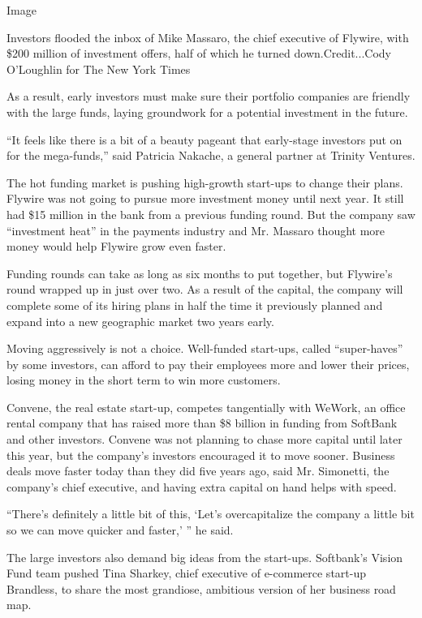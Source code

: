 Image

Investors flooded the inbox of Mike Massaro, the chief executive of
Flywire, with \$200 million of investment offers, half of which he
turned down.Credit...Cody O'Loughlin for The New York Times

As a result, early investors must make sure their portfolio companies
are friendly with the large funds, laying groundwork for a potential
investment in the future.

``It feels like there is a bit of a beauty pageant that early-stage
investors put on for the mega-funds,'' said Patricia Nakache, a general
partner at Trinity Ventures.

The hot funding market is pushing high-growth start-ups to change their
plans. Flywire was not going to pursue more investment money until next
year. It still had \$15 million in the bank from a previous funding
round. But the company saw ``investment heat'' in the payments industry
and Mr. Massaro thought more money would help Flywire grow even faster.

Funding rounds can take as long as six months to put together, but
Flywire's round wrapped up in just over two. As a result of the capital,
the company will complete some of its hiring plans in half the time it
previously planned and expand into a new geographic market two years
early.

Moving aggressively is not a choice. Well-funded start-ups, called
``super-haves'' by some investors, can afford to pay their employees
more and lower their prices, losing money in the short term to win more
customers.

Convene, the real estate start-up, competes tangentially with WeWork, an
office rental company that has raised more than \$8 billion in funding
from SoftBank and other investors. Convene was not planning to chase
more capital until later this year, but the company's investors
encouraged it to move sooner. Business deals move faster today than they
did five years ago, said Mr. Simonetti, the company's chief executive,
and having extra capital on hand helps with speed.

``There's definitely a little bit of this, `Let's overcapitalize the
company a little bit so we can move quicker and faster,' '' he said.

The large investors also demand big ideas from the start-ups. Softbank's
Vision Fund team pushed Tina Sharkey, chief executive of e-commerce
start-up Brandless, to share the most grandiose, ambitious version of
her business road map.

